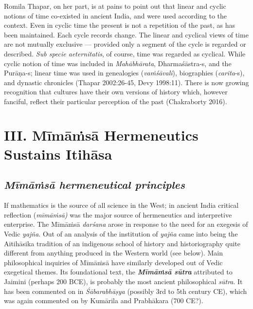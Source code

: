 Romila Thapar, on her part, is at pains to point out that linear and cyclic notions of time co-existed in ancient India, and were used according to the context. Even in cyclic time  the present is not a repetition of the past, as has been maintained. Each cycle records change. The linear and cyclical views of time are not mutually exclusive — provided only a segment of the cycle is regarded or described. \textit{Sub specie aeternitatis}, of course, time was regarded as cyclical. While cyclic notion of time was included in \textit{Mahābhārata}, Dharmaśāstra-s, and the Purāṇa-s; linear time was used in genealogies (\textit{vaṁśāvali}), biographies (\textit{carita}-s), and dynastic chronicles (Thapar 2002:26-45, Devy 1998:11). There is now growing recognition that cultures have their own versions of history which, however fanciful, reflect their particular perception of the past (Chakraborty 2016).


\section*{III. Mīmāṁsā Hermeneutics Sustains Itihāsa}

\subsection*{\textit{Mīmāṁsā hermeneutical principles}}

If mathematics is the source of all science in the West; in ancient India critical reflection (\textit{mīmāṁsā) }was the major source of hermeneutics and interpretive enterprise. The Mīmāṁsā \textit{darśana} arose in response to the need for an exegesis of Vedic \textit{yajña}. Out of an analysis of the institution of \textit{yajña} came into being the Aitihāsika tradition of an indigenous school of history and historiography quite different from anything produced in the Western world (see below). Main philosophical inquiries of Mīmāṁsā have similarly developed out of Vedic exegetical themes. Its foundational text, the \textbf{\textit{Mīmāṁsā sūtra}} attributed to Jaimini (perhaps 200 BCE), is probably the most ancient philosophical \textit{sūtra}. It has been commented on in \textit{Śābarabhāṣya} (possibly 3rd to 5th century CE), which was again commented on by Kumārila and Prabhākara (700 CE?).

